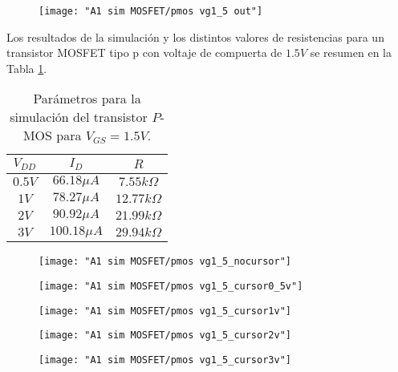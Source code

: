 \documentclass[9pt,technote]{IEEEtran}
\begin{document}
	\begin{figure}[H]
		\centering
		\texttt{[image: "A1 sim MOSFET/pmos vg1\_5 out"]}
		\caption{}
		\label{fig:pmos-vg15-out}
	\end{figure}

    Los resultados de la simulación y los distintos valores de resistencias para un transistor MOSFET tipo p con voltaje de compuerta de $1.5V$ se resumen en la Tabla \ref{Tabla:res_VG15_pmos:1}.
	
	\begin{table}[H]
		\centering
		\begin{tabular}{|c|c|c|}
			\hline
			$V_{DD}$ & $I_{D}$ & $R$\\
			\hline
			$0.5V$ & $66.18 \mu A$ & $7.55 k\Omega$\\ 
			$1V$ & $78.27 \mu A$ &  $12.77 k\Omega$\\ 
			$2V$ & $90.92 \mu A$ &  $21.99 k\Omega$\\
			$3V$ & $100.18 \mu A$ & $29.94 k\Omega$\\
			\hline
		\end{tabular}
		\caption{Parámetros para la simulación del transistor $P$-MOS para $V_{GS}=1.5V$.}
		\label{Tabla:res_VG15_pmos:1}
	\end{table}

	\begin{figure}[H]
		\centering
		\texttt{[image: "A1 sim MOSFET/pmos vg1\_5\_nocursor"]}
		\caption{}
		\label{fig:pmos-vg15nocursor}
	\end{figure}
	
	\begin{figure}[H]
		\centering
		\texttt{[image: "A1 sim MOSFET/pmos vg1\_5\_cursor0\_5v"]}
		\caption{}
		\label{fig:pmos-vg15cursor05v}
	\end{figure}
	
	\begin{figure}[H]
		\centering
		\texttt{[image: "A1 sim MOSFET/pmos vg1\_5\_cursor1v"]}
		\caption{}
		\label{fig:pmos-vg15cursor1v}
	\end{figure}
	
	\begin{figure}[H]
		\centering
		\texttt{[image: "A1 sim MOSFET/pmos vg1\_5\_cursor2v"]}
		\caption{}
		\label{fig:pmos-vg15cursor2v}
	\end{figure}
	
	\begin{figure}[H]
		\centering
		\texttt{[image: "A1 sim MOSFET/pmos vg1\_5\_cursor3v"]}
		\caption{}
		\label{fig:pmos-vg15cursor3v}
	\end{figure}
		
\end{document}

